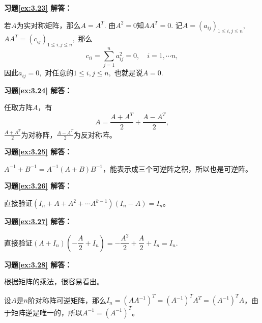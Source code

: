 \vspace{1.5em}

\textbf{习题\ref{ex:3.23} 解答：}

若$A$为实对称矩阵，那么$A = A^T.$ 由$A^2 = 0$知$AA^T = 0.$ 记$A = (a_{ij})_{1 \leqslant i,j \leqslant n},$ $AA^T = (c_{ij})_{1 \leqslant i,j \leqslant n},$ 那么
$$c_{ii} = \sum\limits_{j = 1}^n a_{ij}^2 = 0, \quad i = 1, \cdots n,$$
因此$a_{ij} = 0,$ 对任意的$1 \leqslant i,j \leqslant n,$ 也就是说$A=0.$

\vspace{1.5em}

\textbf{习题\ref{ex:3.24} 解答：}

任取方阵$A$，有
$$A = \frac{A+A^T}{2} + \frac{A-A^T}{2},$$
$\frac{A+A^T}{2}$为对称阵，$\frac{A-A^T}{2}$为反对称阵。

\vspace{1.5em}

\textbf{习题\ref{ex:3.25} 解答：}

$A^{-1} + B^{-1} = A^{-1}(A + B)B^{-1}$，能表示成三个可逆阵之积，所以也是可逆阵。

\vspace{1.5em}

\textbf{习题\ref{ex:3.26} 解答：}

直接验证$(I_n + A + A^2 + \cdots A^{k-1})(I_n - A) = I_n$。

\vspace{1.5em}

\textbf{习题\ref{ex:3.27} 解答：}

直接验证$(A+I_n)(-\dfrac{A}{2}+I_n) = -\dfrac{A^2}{2} + \dfrac{A}{2} + I_n = I_n.$

\vspace{1.5em}

\textbf{习题\ref{ex:3.28} 解答：}

\enum
\item[(1)] 根据矩阵的乘法，很容易看出。

\item[(2)] 设$A$是$n$阶对称阵可逆矩阵，那么$I_n = (AA^{-1})^T = (A^{-1})^T A^T = (A^{-1})^T A$，由于矩阵逆是唯一的，所以$A^{-1} = (A^{-1})^T$。

